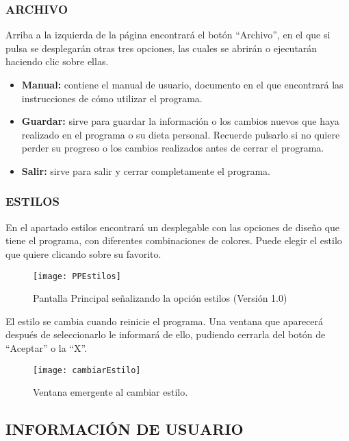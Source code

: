 \subsubsection{ARCHIVO}
Arriba a la izquierda de la página encontrará el botón “Archivo”, en el que si pulsa se desplegarán otras tres opciones, las cuales se abrirán o ejecutarán haciendo clic sobre ellas.
\begin{itemize}
\item	\textbf{Manual:} contiene el manual de usuario, documento en el que encontrará las instrucciones de cómo utilizar el programa.
\item	\textbf{Guardar:} sirve para guardar la información o los cambios nuevos que haya realizado en el programa o su dieta personal. Recuerde pulsarlo si no quiere perder su progreso o los cambios realizados antes de cerrar el programa.
\item	\textbf{Salir:} sirve para salir y cerrar completamente el programa.
\end{itemize}
\subsubsection{ESTILOS}
En el apartado estilos encontrará un desplegable con las opciones de diseño que tiene el programa, con diferentes combinaciones de colores. Puede elegir el estilo que quiere clicando sobre su favorito.\\
\begin{figure}
\centering
\texttt{[image: PPEstilos]}
\caption{Pantalla Principal señalizando la opción estilos (Versión 1.0)}
\end{figure}
\pagebreak

El estilo se cambia cuando reinicie el programa. Una ventana que aparecerá después de seleccionarlo le informará de ello, pudiendo cerrarla del botón de “Aceptar” o la “X”.\\
\begin{figure}[b]
\centering
\texttt{[image: cambiarEstilo]}
\caption{Ventana emergente al cambiar estilo.}
\end{figure}

\clearpage

\subsection{INFORMACIÓN DE USUARIO}

